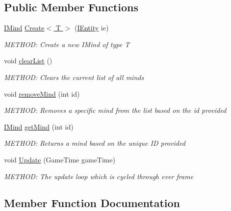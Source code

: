 \subsection*{Public Member Functions}
\begin{DoxyCompactItemize}
\item 
\hyperlink{a00446}{I\+Mind} \hyperlink{a00418_ad821620edeb0239197446bf1c3c32ee3}{Create$<$ T $>$} (\hyperlink{a00438}{I\+Entity} ie)
\begin{DoxyCompactList}\small\item\em M\+E\+T\+H\+OD\+: Create a new I\+Mind of type T \end{DoxyCompactList}\item 
void \hyperlink{a00418_ae944227a75ab665c4140628279296580}{clear\+List} ()
\begin{DoxyCompactList}\small\item\em M\+E\+T\+H\+OD\+: Clears the current list of all minds \end{DoxyCompactList}\item 
void \hyperlink{a00418_a6f89adf3a1d8286a73b534855847c414}{remove\+Mind} (int id)
\begin{DoxyCompactList}\small\item\em M\+E\+T\+H\+OD\+: Removes a specific mind from the list based on the id provided \end{DoxyCompactList}\item 
\hyperlink{a00446}{I\+Mind} \hyperlink{a00418_ac1d24fb690a665ce8c70671b7c27b9ad}{get\+Mind} (int id)
\begin{DoxyCompactList}\small\item\em M\+E\+T\+H\+OD\+: Returns a mind based on the unique ID provided \end{DoxyCompactList}\item 
void \hyperlink{a00418_af161090c055167e2ca3901ed13d3d128}{Update} (Game\+Time game\+Time)
\begin{DoxyCompactList}\small\item\em M\+E\+T\+H\+OD\+: The update loop which is cycled through ever frame \end{DoxyCompactList}\end{DoxyCompactItemize}


\subsection{Member Function Documentation}
\mbox{\label{a00418_ae944227a75ab665c4140628279296580}} 
